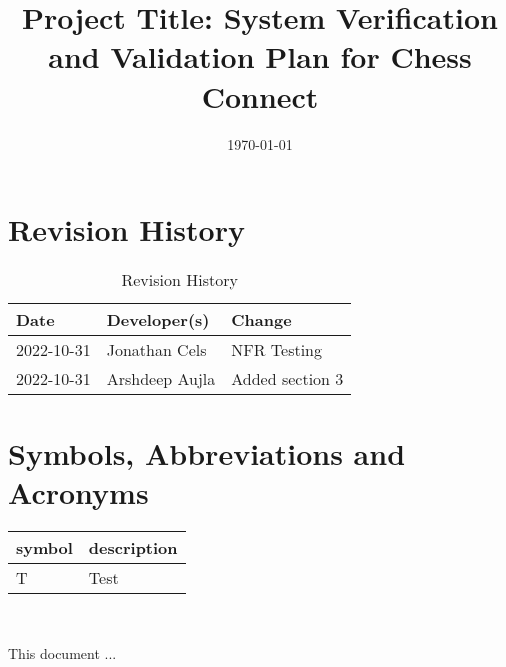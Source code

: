 \documentclass[12pt, titlepage]{article}
\begin{document}
\title{Project Title: System Verification and Validation Plan for Chess Connect} 
\author{\authname}
\date{\today}
	
\maketitle


\section{Revision History}

\begin{table}[hp]
\caption{Revision History} \label{TblRevisionHistory}
\begin{tabularx}{\textwidth}{llX}
\toprule
\textbf{Date} & \textbf{Developer(s)} & \textbf{Change}\\
\midrule
2022-10-31 & Jonathan Cels & NFR Testing\\
2022-10-31 & Arshdeep Aujla & Added section 3\\
\bottomrule
\end{tabularx}
\end{table}

\newpage

\tableofcontents

\listoftables
{}

\listoffigures
{}

\newpage

\section{Symbols, Abbreviations and Acronyms}

\renewcommand{\arraystretch}{1.2}
\begin{tabular}{l l} 
  \toprule		
  \textbf{symbol} & \textbf{description}\\
  \midrule 
  T & Test\\
  \bottomrule
\end{tabular}\\


\newpage


This document ... 
\end{document}
